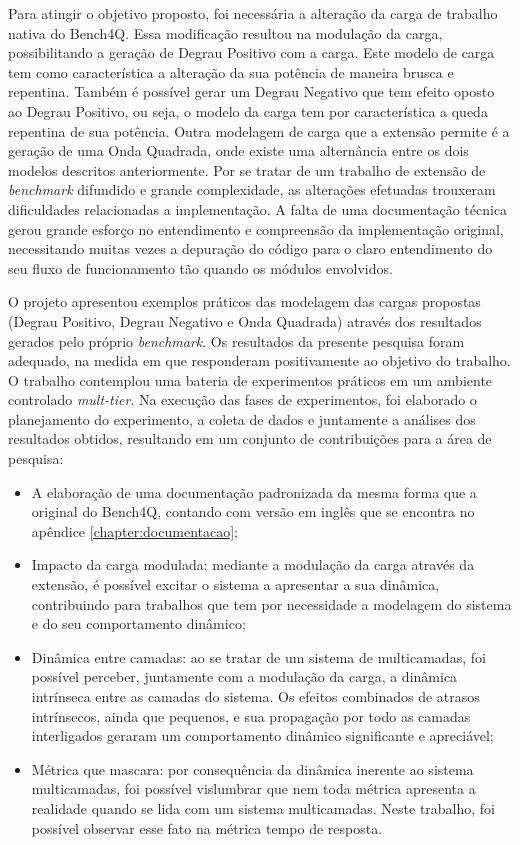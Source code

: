 Para atingir o objetivo proposto, foi necessária a alteração da carga de trabalho nativa do Bench4Q. Essa modificação resultou na modulação da carga, possibilitando a geração de Degrau Positivo com a carga. Este modelo de carga tem como característica a alteração da sua potência de maneira brusca e repentina. Também é possível gerar um Degrau Negativo que tem efeito oposto ao Degrau Positivo, ou seja, o modelo da carga tem por característica a queda repentina de sua potência. Outra modelagem de carga que a extensão permite é a geração de uma Onda Quadrada, onde existe uma alternância entre os dois modelos descritos anteriormente. 
Por se tratar de um trabalho de extensão de \textit{benchmark} difundido e grande complexidade, as alterações efetuadas trouxeram dificuldades relacionadas a implementação. A falta de uma documentação técnica gerou grande esforço no entendimento e compreensão da implementação original, necessitando muitas vezes a depuração do código para o claro entendimento do seu fluxo de funcionamento tão quando os módulos envolvidos.

O projeto apresentou exemplos práticos das modelagem das cargas propostas (Degrau Positivo, Degrau Negativo e Onda Quadrada) através dos resultados gerados pelo próprio \textit{benchmark}. Os resultados da presente pesquisa foram adequado, na medida em que responderam positivamente ao objetivo do trabalho. O trabalho contemplou uma bateria de experimentos práticos em um ambiente controlado \textit{mult-tier}. Na execução das fases de experimentos, foi elaborado o planejamento do experimento, a coleta de dados e juntamente a análises dos resultados obtidos, resultando em um conjunto de contribuições para a área de pesquisa:
\begin{itemize}
	\item A elaboração de uma documentação padronizada da mesma forma que a original do Bench4Q, contando com versão em inglês que se encontra no apêndice \ref{chapter:documentacao};
	
	\item Impacto da carga modulada: mediante a modulação da carga através da extensão, é possível excitar o sistema a apresentar a sua dinâmica, contribuindo para trabalhos que tem por necessidade a modelagem do sistema e do seu comportamento dinâmico;
	
	\item Dinâmica entre camadas: ao se tratar de um sistema de multicamadas, foi possível perceber, juntamente com a modulação da carga, a dinâmica intrínseca entre as camadas do sistema. Os efeitos combinados de atrasos intrínsecos, ainda que pequenos, e sua propagação por todo as camadas interligados geraram um comportamento dinâmico significante e apreciável;
	
	\item Métrica que mascara: por consequência da dinâmica inerente ao sistema multicamadas, foi possível vislumbrar que nem toda métrica apresenta a realidade quando se lida com um sistema multicamadas. Neste trabalho, foi possível observar esse fato na métrica tempo de resposta.
\end{itemize} 

